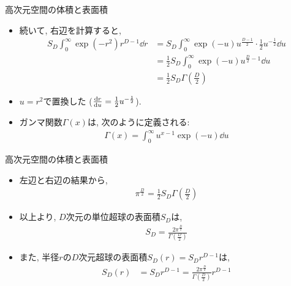 \documentclass[dvipdfmx,notheorems,t]{beamer}
\begin{document}
\begin{frame}{高次元空間の体積と表面積}
\begin{itemize}
  \item 続いて, 右辺を計算すると,
  \begin{align*}
    S_D \int_0^\infty \exp(-r^2) r^{D - 1} \dd{r}
    &= S_D \int_0^\infty \exp(-u) u^\frac{D - 1}{2} \cdot \frac{1}{2} u^{-\frac{1}{2}} \dd{u} \\
    &= \frac{1}{2} S_D \int_0^\infty \exp(-u) u^{\frac{D}{2} - 1} \dd{u} \\
    &= \frac{1}{2} S_D \Gamma \left( \frac{D}{2} \right)
  \end{align*}
  \item $u = r^2$で置換した ($\dv{r}{u} = \frac{1}{2} u^{-\frac{1}{2}}$).
  \item ガンマ関数$\Gamma(x)$は, 次のように定義される:
  \begin{align*}
    \Gamma(x) = \int_0^\infty u^{x - 1} \exp(-u) \dd{u}
  \end{align*}
\end{itemize}
\end{frame}

\begin{frame}{高次元空間の体積と表面積}
\begin{itemize}
  \item 左辺と右辺の結果から,
  \begin{align*}
    \pi^\frac{D}{2} = \frac{1}{2} S_D \Gamma \left( \frac{D}{2} \right)
  \end{align*}
  \item 以上より, $D$次元の単位超球の表面積$S_D$は,
  \begin{align*}
    S_D = \frac{2 \pi^\frac{D}{2}}{\Gamma \left( \frac{D}{2} \right)}
  \end{align*}
  \item また, 半径$r$の$D$次元超球の表面積$S_D(r) = S_D r^{D - 1}$は,
  \begin{align*}
    S_D(r) &= S_D r^{D - 1} = \frac{2 \pi^\frac{D}{2}}{\Gamma \left( \frac{D}{2} \right)} r^{D - 1}
  \end{align*}
\end{itemize}
\end{frame}
\end{document}
